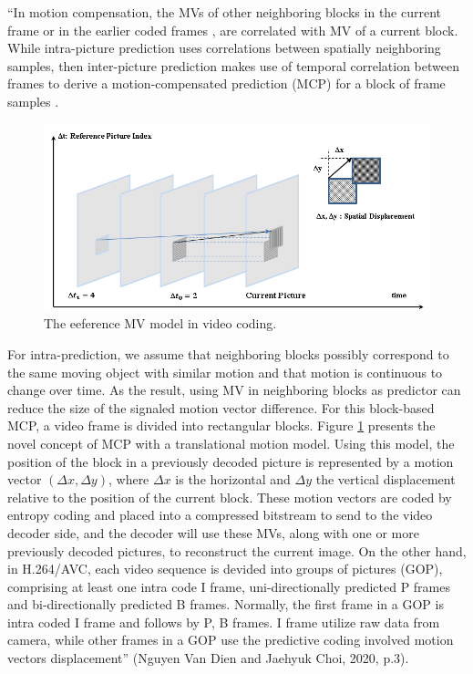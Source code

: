   “In  motion compensation, the MVs of other neighboring blocks in the current frame or in the earlier coded frames \cite{laroche2008rd}, \cite{jiang2019spatial} are correlated with MV of a current block. While intra-picture prediction uses correlations between spatially neighboring samples, then inter-picture prediction makes use of temporal correlation between frames to derive a motion-compensated prediction (MCP) for a block of frame samples \cite{bross2014inter}.
\begin{figure}
\centering
 \includegraphics[width=1.0\linewidth]{Figures/mv.png}
 \caption{ The eeference MV model in video coding.}
 \label{fig:mv}
\end{figure}
For intra-prediction, we assume that neighboring blocks possibly correspond to the same moving object with similar motion and that motion  is continuous to change over time. As the result, using MV in neighboring blocks as predictor can reduce the size of the signaled motion vector difference. For this block-based MCP, a video frame is divided into rectangular blocks. Figure \ref{fig:mv} presents the novel concept of MCP with a translational motion model. Using this model, the position of the block in a previously decoded picture is represented by a motion vector $(\Delta x, \Delta y)$, where $\Delta x$ is the horizontal and $\Delta y$ the vertical displacement relative to the position of the current block. These motion vectors are coded by entropy coding and placed into a compressed bitstream to send to the video decoder side,  and the decoder will use these MVs, along with one or more previously decoded pictures, to reconstruct the current image. On the other hand, in H.264/AVC, each video sequence is devided into groups of pictures (GOP), comprising at least one intra code I frame, uni-directionally predicted P frames and bi-directionally predicted B frames. Normally, the first frame in a GOP is intra coded I frame and follows by P, B frames. I frame utilize raw data from camera, while other frames in a GOP use the predictive coding involved motion vectors displacement” (Nguyen Van Dien and Jaehyuk Choi, 2020, p.3). \\
